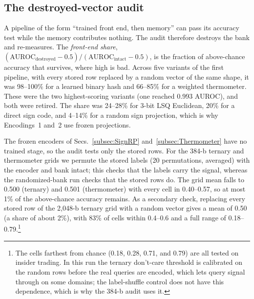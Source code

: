 \documentclass[conference]{IEEEtran}
\newcommand{\auroc}{{AUROC}\xspace}
\begin{document}
\subsection{The destroyed-vector audit}
\label{subsec:Audit}
\label{subsec:AuditResults}
A pipeline of the form ``trained front end, then memory'' can pass
its accuracy test while the memory contributes nothing. The audit
therefore destroys the bank and re-measures. The \emph{front-end
share},
$(\mathrm{AUROC}_{\mathrm{destroyed}}-0.5)/(\mathrm{AUROC}_{\mathrm{intact}}-0.5)$,
is the fraction of above-chance accuracy that survives, where high is
bad. Across five variants of the first pipeline, with every stored
row replaced by a random vector of the same shape, it was 98--100\%
for a learned binary hash and 66--85\% for a weighted thermometer.
These were the two highest-scoring variants (one reached 0.993
\auroc), and both were retired. The share was 24--28\% for 3-bit LSQ
Euclidean, 20\% for a direct sign code, and 4--14\% for a random sign
projection, which is why Encodings~1 and~2 use frozen projections.

The frozen encoders of Secs.~\ref{subsec:SignRP}
and~\ref{subsec:Thermometer} have no trained stage, so the audit
tests only the stored rows. For the 384-b ternary and thermometer
grids we permute the stored labels (20 permutations, averaged) with
the encoder and bank intact; this checks that the labels carry the
signal, whereas the randomized-bank run checks that the stored rows
do. The grid mean falls to 0.500 (ternary) and 0.501 (thermometer)
with every cell in 0.40--0.57, so at most 1\% of the above-chance
accuracy remains. As a secondary check, replacing every stored row
of the 2{,}048-b ternary grid with a random vector gives a mean of
0.50 (a share of about 2\%), with 83\% of cells within 0.4--0.6 and a
full range of 0.18--0.79.\footnote{The cells farthest from chance
(0.18, 0.28, 0.71, and 0.79) are all tested on insider trading. In
this run the ternary don't-care threshold is calibrated on the random
rows before the real queries are encoded, which lets query signal
through on some domains; the label-shuffle control does not have this
dependence, which is why the 384-b audit uses it.}

\end{document}
